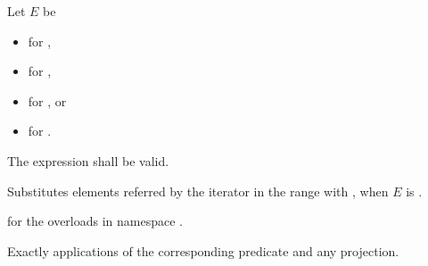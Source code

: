 \begin{itemdescr}
\pnum
Let $E$ be
\begin{itemize}
\item {} for ,
\item {} for ,
\item {} for , or
\item {} for .
\end{itemize}

\pnum
\requires
The expression  shall be valid.

\pnum
\effects
Substitutes elements referred by the iterator 
in the range  with ,
when $E$ is .

\pnum
\returns
{} for the overloads in namespace .

\pnum
\complexity
Exactly  applications
of the corresponding predicate and any projection.
\end{itemdescr}

